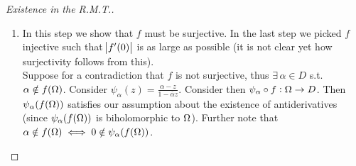 \begin{proof}[Existence in the R.M.T.]
\begin{enumerate}
\begin{proof}
For a contradiction suppose that $f$ is neither injective nor constant. In particular $\exists \, z_1 \neq z_2 \in \om$ s.t. $f(z_1) = f(z_2)$. Let $g_n \defas f_n(z) - f_n(z_1) \tou f(z) - f(z_1) = g(z)$. Then $g \nequiv 0$ since $f $ is non-constant. Note that $g(z_2) = 0$. Then $z_2$ is an isolated $0$ for $g$ of order $N \geq 1$. By the Logarithmic Derivative Formula (for some $\varepsilon>0$ small such that $g(w) \neq 0 \; \forall \, 0 < \abs{w - z_2} < \varepsilon$):

\begin{align*}
    1 \leq N = \frac{1}{2 \pi i } \int_{\partial D_\varepsilon (z_2)} \frac{g'(w)}{g(w)} \dif w
\end{align*}

Since $g_n \to g$ locally uniformly, thus $g_n' \to g'$ locally uniformly. Thus:

\begin{align*}
    \frac{g_n'(w)}{g_n(w)} \to \frac{g'(w)}{g(w)} &\text{ uniformly for $w \in \partial D_\varepsilon (z_2)$}\\
    &\Downarrow\\
    \frac{1}{2 \pi i } \int_{\partial D_\varepsilon (z_2)} \frac{g_n'(w)}{g_n(w)} \dif w &\to \frac{1}{2 \pi i } \int_{\partial D_\varepsilon (z_2)} \frac{g'(w)}{g(w)} \dif w \geq 1
\end{align*}
The LHS is equal to the number of zeroes of $g_n$ inside $D_\varepsilon (z_2)$. But since $f_n$ is injective, $g_n$ has no zeroes in $D_\varepsilon (z_1)$, thus the $\text{LHS} = 0 \; \lightning$.
\end{proof}

It follows that our $f$ is injective, and hence $f \in \mathscr{F}$.\\

\subsection{Step 3}

\item In this step we show that $f$ must be surjective. In the last step we picked $f$ injective such that $\abs{f'(0)}$ is as large as possible (it is not clear yet how surjectivity follows from this).\\

Suppose for a contradiction that $f$ is not surjective, thus $\exists \, \alpha \in D$ s.t. $\alpha \notin f(\Omega)$. Consider $\psi_\alpha (z) = \frac{\alpha - z}{ 1 - \overline{\alpha} z}$. Consider then $\psi_\alpha \circ f : \Omega \to D$. Then $\psi_\alpha ( f(\Omega))$ satisfies our assumption about the existence of antiderivatives (since $\psi_\alpha ( f(\Omega))$  is biholomorphic to $\Omega$). Further note that $\alpha \notin f(\Omega) \iff 0 \notin \psi_\alpha ( f(\Omega))$.\\


\end{enumerate}
\end{proof}
